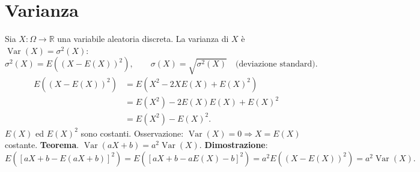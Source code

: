 \documentclass[11pt,a4paper]{article}
\newcommand{\pagina}[1]{\clearpage}
\begin{document}
\section*{Varianza}
Sia $X:\Omega\to\mathbb R$ una variabile aleatoria discreta. La varianza di $X$ è $\operatorname{Var}(X)=\sigma^2(X)$:
\[\boxed{\sigma^2(X)=E((X-E(X))^2)},\qquad \sigma(X)=\sqrt{\sigma^2(X)}\quad\text{(deviazione standard)}.\]
\begin{align*}
E((X-E(X))^2)&=E(X^2-2XE(X)+E(X)^2)\\
&=E(X^2)-2E(X)E(X)+E(X)^2\\
&=\boxed{E(X^2)-E(X)^2}.
\end{align*}
$E(X)$ ed $E(X)^2$ sono costanti. Osservazione: $\operatorname{Var}(X)=0\Rightarrow X=E(X)$ costante.
\pagina{21}\textbf{Teorema}. $\operatorname{Var}(aX+b)=a^2\operatorname{Var}(X)$.
\textbf{Dimostrazione}:
\[E([aX+b-E(aX+b)]^2)=E([aX+b-aE(X)-b]^2)=a^2E((X-E(X))^2)=a^2\operatorname{Var}(X).\]
\end{document}
